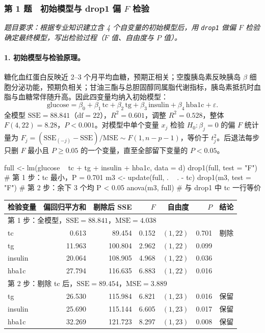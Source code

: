 \subsubsection*{第 1 题　初始模型与 drop1 偏 $F$ 检验}
\emph{题目要求：根据专业知识建立含 4 个自变量的初始模型后，用 \texttt{drop1} 做偏 $F$ 检验确定最终模型，写出检验过程（$F$ 值、自由度与 $P$ 值）。}

\paragraph{1. 初始模型与检验原理。}糖化血红蛋白反映近 2--3 个月平均血糖，预期正相关；空腹胰岛素反映胰岛 $\beta$ 细胞分泌功能，预期负相关；甘油三酯与总胆固醇同属脂代谢指标，胰岛素抵抗时血脂与血糖常伴随升高。因此四变量均纳入初始模型：
\[
\text{glucose}=\beta_0+\beta_1\,\text{tc}+\beta_2\,\text{tg}+\beta_3\,\text{insulin}+\beta_4\,\text{hba1c}+\varepsilon .
\]
全模型 $\mathrm{SSE}=88.841$（$\mathrm{df}=22$），$R^2=0.601$，调整 $R^2=0.528$，整体 $F(4,22)=8.28$，$P<0.001$。对模型中单个变量 $x_j$ 检验 $H_0:\beta_j=0$ 的偏 $F$ 统计量为 $F_j=(\mathrm{SSE}_{(-j)}-\mathrm{SSE})/\mathrm{MSE}\sim F(1,n-p-1)$，等价于 $t_j^2$。后退法每步只删 $F$ 最小且 $P\ge 0.05$ 的一个变量，直至全部留下变量的 $P<0.05$。

\begin{rcode}
full <- lm(glucose ~ tc + tg + insulin + hba1c, data = d)
drop1(full, test = "F")                          # 第 1 步：tc 最小，P = 0.701
m3 <- update(full, . ~ . - tc)
drop1(m3, test = "F")                            # 第 2 步：余下 3 个均 P < 0.05
anova(m3, full)                                  # 与 drop1 中 tc 一行等价
\end{rcode}


\begin{tabular}{lrrrrrl}
\toprule
检验变量 & 偏回归平方和 & 剔除后 SSE & $F$ & 自由度 & $P$ & 结论\\
\midrule
\multicolumn{7}{l}{第 1 步：全模型，$\mathrm{SSE}=88.841$，$\mathrm{MSE}=4.038$}\\
tc      & 0.613  & 89.454  & 0.152 & $(1,22)$ & 0.701 & 剔除\\
tg      & 11.963 & 100.804 & 2.962 & $(1,22)$ & 0.099 & \\
insulin & 20.064 & 108.905 & 4.968 & $(1,22)$ & 0.036 & \\
hba1c   & 27.794 & 116.635 & 6.883 & $(1,22)$ & 0.016 & \\
\midrule
\multicolumn{7}{l}{第 2 步：剔除 tc 后，$\mathrm{SSE}=89.454$，$\mathrm{MSE}=3.889$}\\
tg      & 26.530 & 115.984 & 6.821 & $(1,23)$ & 0.016 & 保留\\
insulin & 25.690 & 115.144 & 6.605 & $(1,23)$ & 0.017 & 保留\\
hba1c   & 32.269 & 121.723 & 8.297 & $(1,23)$ & 0.008 & 保留\\
\bottomrule
\end{tabular}



